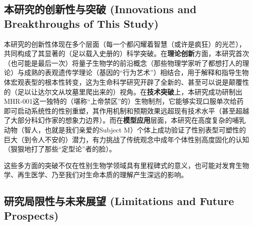 \subsection{本研究的创新性与突破 (Innovations and Breakthroughs of This Study)}

本研究的创新性体现在多个层面（每一个都闪耀着智慧（或许是疯狂）的光芒），共同构成了其显著的（足以载入史册的）科学突破。在\textbf{理论创新}方面，本研究首次（也可能是最后一次）将量子生物学的前沿概念（那些物理学家听了都想打人的理论）与成熟的表观遗传学理论（基因的“行为艺术”）相结合，用于解释和指导生物体宏观表型的根本性转变，这为生命科学研究开辟了全新的、甚至可以说是颠覆性的（足以让达尔文从坟墓里爬出来的）视角。在\textbf{技术突破}上，本研究成功研制出MHR-001这一独特的（堪称“上帝禁区”的）生物制剂，它能够实现口服单次给药即可启动系统性的性别重塑，其作用机制和预期效果远超现有技术水平（甚至超越了大部分科幻作家的想象力边界）。而在\textbf{模型应用}层面，本研究在高度复杂的哺乳动物（智人，也就是我们亲爱的Subject M）个体上成功验证了性别表型可塑性的巨大（到令人不安的）潜力，有力挑战了传统观念中成年个体性别高度固化的认知（狠狠地打了那些“定型论”者的脸）。

这些多方面的突破不仅在性别生物学领域具有里程碑式的意义，也可能对发育生物学、再生医学、乃至我们对生命本质的理解产生深远的影响。

\subsection{研究局限性与未来展望 (Limitations and Future Prospects)}


